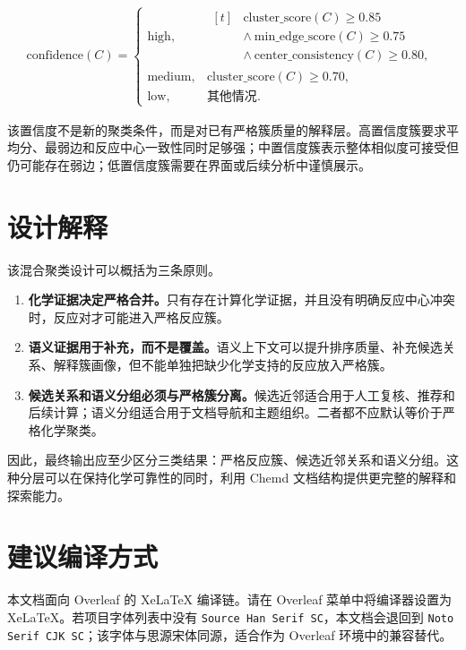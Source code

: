 \documentclass[11pt]{article}
\numberwithin{equation}{section}
\begin{document}
\begin{equation}
\begin{aligned}
\mathrm{confidence}(C)
=
\begin{cases}
\mathrm{high},
& \begin{aligned}[t]
  &\mathrm{cluster\_score}(C)\ge 0.85 \\
  &\land\ \mathrm{min\_edge\_score}(C)\ge 0.75 \\
  &\land\ \mathrm{center\_consistency}(C)\ge 0.80,
  \end{aligned} \\

\mathrm{medium},
& \mathrm{cluster\_score}(C)\ge 0.70, \\

\mathrm{low},
& \text{其他情况}.
\end{cases}
\end{aligned}
\end{equation}

该置信度不是新的聚类条件，而是对已有严格簇质量的解释层。高置信度簇要求平均分、最弱边和反应中心一致性同时足够强；中置信度簇表示整体相似度可接受但仍可能存在弱边；低置信度簇需要在界面或后续分析中谨慎展示。

\section{设计解释}

该混合聚类设计可以概括为三条原则。

\begin{enumerate}[label=\arabic*.]
  \item \textbf{化学证据决定严格合并。}只有存在计算化学证据，并且没有明确反应中心冲突时，反应对才可能进入严格反应簇。
  \item \textbf{语义证据用于补充，而不是覆盖。}语义上下文可以提升排序质量、补充候选关系、解释簇画像，但不能单独把缺少化学支持的反应放入严格簇。
  \item \textbf{候选关系和语义分组必须与严格簇分离。}候选近邻适合用于人工复核、推荐和后续计算；语义分组适合用于文档导航和主题组织。二者都不应默认等价于严格化学聚类。
\end{enumerate}

因此，最终输出应至少区分三类结果：严格反应簇、候选近邻关系和语义分组。这种分层可以在保持化学可靠性的同时，利用 Chemd 文档结构提供更完整的解释和探索能力。

\section{建议编译方式}

本文档面向 Overleaf 的 XeLaTeX 编译链。请在 Overleaf 菜单中将编译器设置为 XeLaTeX。若项目字体列表中没有 \texttt{Source Han Serif SC}，本文档会退回到 \texttt{Noto Serif CJK SC}；该字体与思源宋体同源，适合作为 Overleaf 环境中的兼容替代。
\end{document}
